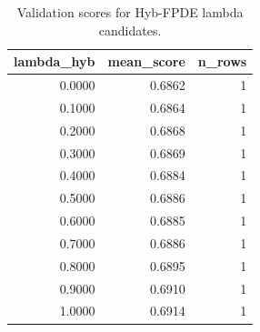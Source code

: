 \begin{table}[t]
\caption{Validation scores for Hyb-FPDE lambda candidates.}
\label{tab:lambda_distribution_computed}
\centering
\begin{tabular}{rrr}
\toprule
lambda\_hyb & mean\_score & n\_rows \\
\midrule
0.0000 & 0.6862 & 1 \\
0.1000 & 0.6864 & 1 \\
0.2000 & 0.6868 & 1 \\
0.3000 & 0.6869 & 1 \\
0.4000 & 0.6884 & 1 \\
0.5000 & 0.6886 & 1 \\
0.6000 & 0.6885 & 1 \\
0.7000 & 0.6886 & 1 \\
0.8000 & 0.6895 & 1 \\
0.9000 & 0.6910 & 1 \\
1.0000 & 0.6914 & 1 \\
\bottomrule
\end{tabular}

\end{table}
